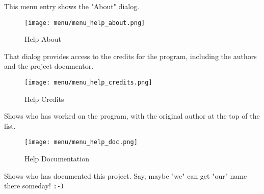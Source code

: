    This menu entry shows the "About" dialog.

\begin{figure}[H]
   \centering 
   \texttt{[image: menu/menu\_help\_about.png]}
   \caption{Help About}
   \label{fig:seq24_menu_help_about}
\end{figure}

   That dialog provides access to the credits for the program, including the
   authors and the project documentor.

\begin{figure}[H]
   \centering 
   \texttt{[image: menu/menu\_help\_credits.png]}
   \caption{Help Credits}
   \label{fig:seq24_menu_help_credits}
\end{figure}

   Shows who has worked on the program, with the original author at the top
   of the list.

\begin{figure}[H]
   \centering 
   \texttt{[image: menu/menu\_help\_doc.png]}
   \caption{Help Documentation}
   \label{fig:seq24_menu_help_doc}
\end{figure}

   Shows who has documented this project.  Say, maybe "we" can get "our"
   name there someday!  \texttt{:-)}



